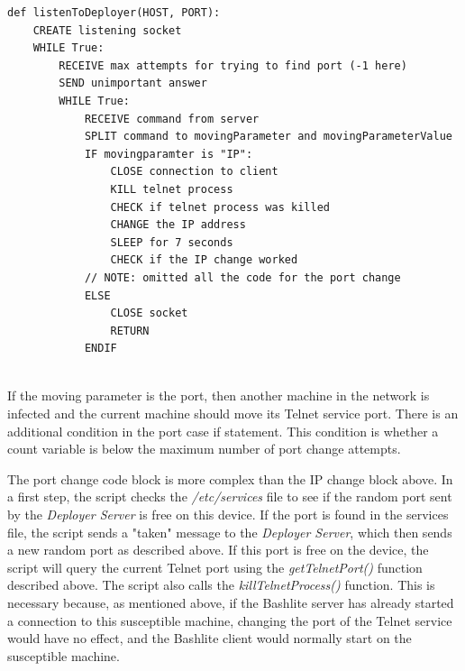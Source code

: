 \begin{lstlisting}[caption={The Code Block for Changing the IP Address of a Client From the \textit{listenToDeployer()} Function in Pseudocode. Everything Related to the Port Change of the Telnet Service has Been Ommited Here.},label={lst:Pseudocode listenToDeployerServerIP.py}]
def listenToDeployer(HOST, PORT):
    CREATE listening socket
    WHILE True:
        RECEIVE max attempts for trying to find port (-1 here)
        SEND unimportant answer
        WHILE True:
            RECEIVE command from server
            SPLIT command to movingParameter and movingParameterValue
            IF movingparamter is "IP":
                CLOSE connection to client
                KILL telnet process
                CHECK if telnet process was killed
                CHANGE the IP address
                SLEEP for 7 seconds
                CHECK if the IP change worked
            // NOTE: omitted all the code for the port change
            ELSE
                CLOSE socket
                RETURN
            ENDIF
            
\end{lstlisting}

If the moving parameter is the port, then another machine in the network is infected and the current machine should move its Telnet service port. There is an additional condition in the port case if statement. This condition is whether a count variable is below the maximum number of port change attempts.

The port change code block is more complex than the IP change block above. In a first step, the script checks the \textit{/etc/services} file to see if the random port sent by the \textit{Deployer Server} is free on this device. If the port is found in the services file, the script sends a "taken" message to the \textit{Deployer Server}, which then sends a new random port as described above. If this port is free on the device, the script will query the current Telnet port using the \textit{getTelnetPort()} function described above. The script also calls the \textit{killTelnetProcess()} function. This is necessary because, as mentioned above, if the Bashlite server has already started a connection to this susceptible machine, changing the port of the Telnet service would have no effect, and the Bashlite client would normally start on the susceptible machine. 

